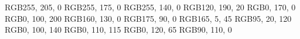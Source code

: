 \definecolor{DbGelb}     		{RGB}{255, 205, 0}
\definecolor{DbSonnengelb}     	{RGB}{255, 175, 0}
\definecolor{DbVerkehrsorange}	{RGB}{255, 140, 0}
\definecolor{DbGelbgruen}     	{RGB}{120, 190, 20}
\definecolor{DbGrasgruen}     	{RGB}{0, 170, 0}
\definecolor{DbSignalblau}     	{RGB}{0, 100, 200}
\definecolor{DbCurrygelb}     	{RGB}{160, 130, 0}
\definecolor{DbOrangebraun}   	{RGB}{175, 90, 0}
\definecolor{DbRubinrot}     	{RGB}{165, 5, 45}
\definecolor{DbPurpurviolett}  	{RGB}{95, 20, 120}
\definecolor{DbVerkehrsblau}  	{RGB}{0, 100, 140}
\definecolor{DbOpalgruen}     	{RGB}{0, 110, 115}
\definecolor{DbTuerkisgruen}  	{RGB}{0, 120, 65}
\definecolor{DbFarngruen}     	{RGB}{90, 110, 0}
